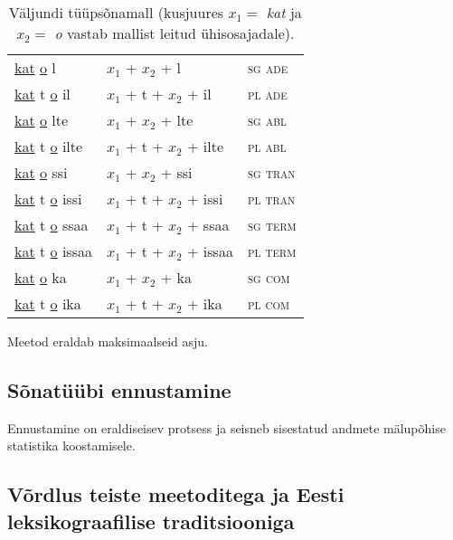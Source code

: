 \documentclass[12pt,a4paper]{article}
\begin{document}
\begin{table}[H]
\begin{minipage}[t]{.55\textwidth}
\begin{tabular}[t]{l l l}
      \underline{kat}   \underline{o} l     & $x_1$ + $x_2$ + l         & \textsc{sg ade} \\
      \underline{kat} t \underline{o} il    & $x_1$ + t + $x_2$ + il    & \textsc{pl ade} \\
      \underline{kat}   \underline{o} lte   & $x_1$ + $x_2$ + lte       & \textsc{sg abl} \\
      \underline{kat} t \underline{o} ilte  & $x_1$ + t + $x_2$ + ilte  & \textsc{pl abl} \\
      \underline{kat}   \underline{o} ssi   & $x_1$ + $x_2$ + ssi       & \textsc{sg tran} \\
      \underline{kat} t \underline{o} issi  & $x_1$ + t + $x_2$ + issi  & \textsc{pl tran} \\
      \underline{kat} t \underline{o} ssaa  & $x_1$ + t + $x_2$ + ssaa  & \textsc{sg term} \\
      \underline{kat} t \underline{o} issaa & $x_1$ + t + $x_2$ + issaa & \textsc{pl term} \\
      \underline{kat}   \underline{o} ka    & $x_1$ + $x_2$ + ka        & \textsc{sg com} \\
      \underline{kat} t \underline{o} ika   & $x_1$ + t + $x_2$ + ika   & \textsc{pl com} \\
    \end{tabular}
    \caption{Väljundi tüüpsõnamall (kus\-juures $x_1 = $ \textit{kat} ja $x_2 = $ \textit{o} vastab mallist leitud ühisosajadale).}
    \label{tab:väljundtabel-katto}
  \end{minipage}
\end{table}

Meetod eraldab maksimaalseid asju.



\subsection{Sõnatüübi ennustamine}
\label{sec:ekstraktmorfoloogia-ennustamine}

Ennustamine on eraldiseisev protsess ja seisneb sisestatud andmete mälupõhise statistika koostamisele.



\subsection{Võrdlus teiste meetoditega ja Eesti leksikograafilise traditsiooniga}
\end{document}
